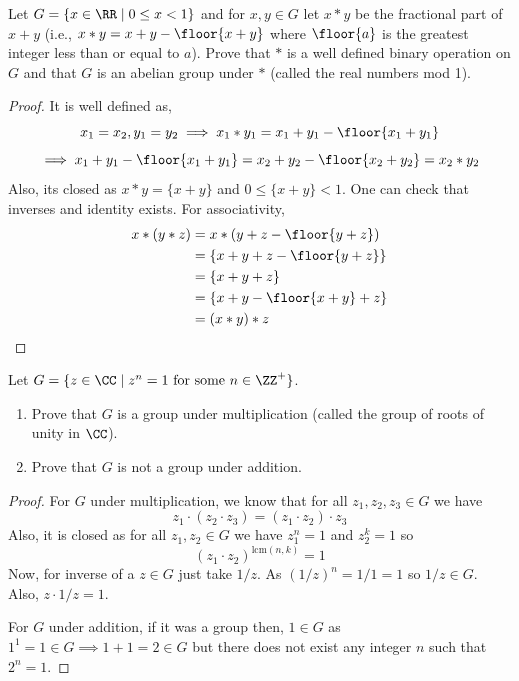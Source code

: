 \begin{problem}
    Let $G = \{x \in \RR \mid 0 \le x < 1\}$ and for $x, y \in G$ let $x*y$ be the fractional part of $x+y$ 
    (i.e., $x*y = x+y - \floor{x+y}$ where $\floor{a}$ is the greatest integer less than or equal to $a$).
    Prove that $*$ is a well defined binary operation on $G$ and that $G$ is an abelian group under $*$ (called the real numbers mod 1).
\end{problem}

\begin{proof}
    It is well defined as,
    \[ x_1 = x_2, y_1 = y_2 \implies x_1*y_1 = x_1+y_1-\floor{x_1+y_1}\]
    \[ \implies x_1+y_1-\floor{x_1+y_1}=x_2+y_2 - \floor{x_2+y_2} = x_2 * y_2 \]
    Also, its closed as $x*y = \{x+y\}$ and $0 \le \{x+y\} < 1$. One can check that inverses and identity exists. For associativity,
    \begin{align*}
        x*(y*z) &= x*(y+z-\floor{y+z}) \\
        &= \{x+y+z - \floor{y+z}\} \\
        &= \{ x+y+z \} \\
        &= \{ x+y-\floor{x+y}+z \} \\
        &= (x*y)*z
    \end{align*}
\end{proof}

\begin{problem}
    Let $G = \{z \in \CC \mid z^n = 1 \text{ for some } n \in \ZZ^+\}$.
    \begin{enumerate}
        \item Prove that $G$ is a group under multiplication (called the group of roots of unity in $\CC$).
        \item Prove that $G$ is not a group under addition.
    \end{enumerate}
\end{problem}

\begin{proof}
    For $G$ under multiplication, we know that for all $z_1,z_2,z_3 \in G$ we have
    \[ z_1 \cdot (z_2 \cdot z_3) = (z_1 \cdot z_2) \cdot z_3 \]
    Also, it is closed as for all $z_1, z_2 \in G$ we have $z_1^n=1$ and $z_2^k=1$ so 
    \[ (z_1 \cdot z_2)^{\text{lcm}(n,k)}=1 \]
    Now, for inverse of a $z \in G$ just take $1/z$. As $(1/z)^n=1/1=1$ so $1/z \in G$. Also, $z \cdot 1/z = 1$.

    For $G$ under addition, if it was a group then, $1 \in G$ as $1^1 = 1 \in G \implies 1+1 = 2 \in G$ but there does not exist any integer
    $n$ such that $2^n=1$.   
\end{proof}

